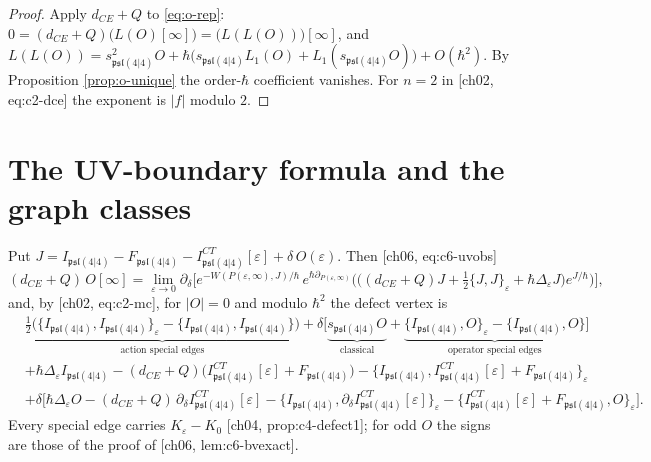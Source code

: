 \begin{proof}
Apply $d_{CE}+Q$ to \eqref{eq:o-rep}: $0=(d_{CE}+Q)\big(L(O)[\infty]\big)=\big(L(L(O))\big)[\infty]$, and $L(L(O))=s_{\mathfrak{psl}(4|4)}^2O+\hbar\big(s_{\mathfrak{psl}(4|4)}L_1(O)+L_1(s_{\mathfrak{psl}(4|4)}O)\big)+O(\hbar^2)$. By Proposition \ref{prop:o-unique} the order-$\hbar$ coefficient vanishes. For $n=2$ in [ch02, eq:c2-dce] the exponent is $|f|$ modulo $2$.
\end{proof}

\section{The UV-boundary formula and the graph classes}

\begin{proposition}
\label{prop:o-uv}
Put $J=I_{\mathfrak{psl}(4|4)}-F_{\mathfrak{psl}(4|4)}-I^{CT}_{\mathfrak{psl}(4|4)}[\varepsilon]+\delta\,O(\varepsilon)$. Then [ch06, eq:c6-uvobs]
\[
(d_{CE}+Q)\,O[\infty]=\lim_{\varepsilon\to0}\partial_\delta\Big[e^{-W(P(\varepsilon,\infty),J)/\hbar}\,e^{\hbar\partial_{P(\varepsilon,\infty)}}\Big(\big((d_{CE}+Q)J+\tfrac12\{J,J\}_\varepsilon+\hbar\Delta_\varepsilon J\big)e^{J/\hbar}\Big)\Big],
\]
and, by [ch02, eq:c2-mc], for $|O|=0$ and modulo $\hbar^2$ the defect vertex is
\begin{equation}
\begin{aligned}
&\underbrace{\tfrac12\big(\{I_{\mathfrak{psl}(4|4)},I_{\mathfrak{psl}(4|4)}\}_\varepsilon-\{I_{\mathfrak{psl}(4|4)},I_{\mathfrak{psl}(4|4)}\}\big)}_{\text{action special edges}}+\delta\Big[\underbrace{s_{\mathfrak{psl}(4|4)}O}_{\text{classical}}+\underbrace{\{I_{\mathfrak{psl}(4|4)},O\}_\varepsilon-\{I_{\mathfrak{psl}(4|4)},O\}}_{\text{operator special edges}}\Big]\\
&+\hbar\Delta_\varepsilon I_{\mathfrak{psl}(4|4)}-(d_{CE}+Q)\big(I^{CT}_{\mathfrak{psl}(4|4)}[\varepsilon]+F_{\mathfrak{psl}(4|4)}\big)-\big\{I_{\mathfrak{psl}(4|4)},I^{CT}_{\mathfrak{psl}(4|4)}[\varepsilon]+F_{\mathfrak{psl}(4|4)}\big\}_\varepsilon\\
&+\delta\Big[\hbar\Delta_\varepsilon O-(d_{CE}+Q)\,\partial_\delta I^{CT}_{\mathfrak{psl}(4|4)}[\varepsilon]-\big\{I_{\mathfrak{psl}(4|4)},\partial_\delta I^{CT}_{\mathfrak{psl}(4|4)}[\varepsilon]\big\}_\varepsilon-\big\{I^{CT}_{\mathfrak{psl}(4|4)}[\varepsilon]+F_{\mathfrak{psl}(4|4)},O\big\}_\varepsilon\Big].
\end{aligned}
\label{eq:o-defect}
\end{equation}
Every special edge carries $K_\varepsilon-K_0$ [ch04, prop:c4-defect1]; for odd $O$ the signs are those of the proof of [ch06, lem:c6-bvexact].
\end{proposition}

